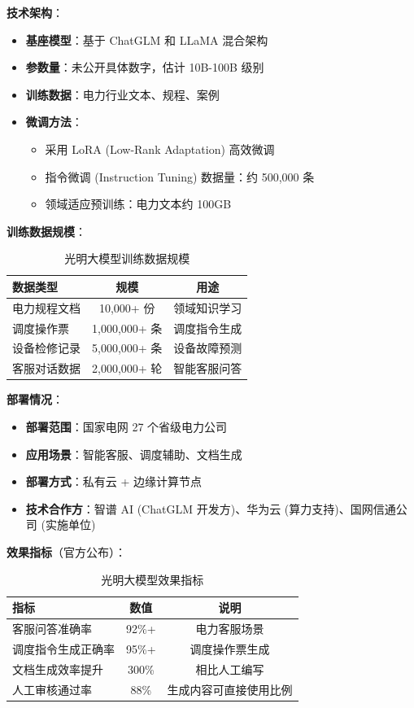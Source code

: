 \documentclass[12pt,a4paper]{article}
\begin{document}
\textbf{技术架构}：

\begin{itemize}
    \item \textbf{基座模型}：基于 ChatGLM 和 LLaMA 混合架构
    \item \textbf{参数量}：未公开具体数字，估计 10B-100B 级别
    \item \textbf{训练数据}：电力行业文本、规程、案例
    \item \textbf{微调方法}：
    \begin{itemize}
        \item 采用 LoRA (Low-Rank Adaptation) 高效微调
        \item 指令微调 (Instruction Tuning) 数据量：约 500,000 条
        \item 领域适应预训练：电力文本约 100GB
    \end{itemize}
\end{itemize}

\textbf{训练数据规模}：

\begin{table}[h]
\centering
\caption{光明大模型训练数据规模}
\label{tab:guangming-data}
\begin{tabular}{@{}lcc@{}}
\toprule
\textbf{数据类型} & \textbf{规模} & \textbf{用途} \\
\midrule
电力规程文档 & 10,000+ 份 & 领域知识学习 \\
调度操作票 & 1,000,000+ 条 & 调度指令生成 \\
设备检修记录 & 5,000,000+ 条 & 设备故障预测 \\
客服对话数据 & 2,000,000+ 轮 & 智能客服问答 \\
\bottomrule
\end{tabular}
\end{table}

\textbf{部署情况}：

\begin{itemize}
    \item \textbf{部署范围}：国家电网 27 个省级电力公司
    \item \textbf{应用场景}：智能客服、调度辅助、文档生成
    \item \textbf{部署方式}：私有云 + 边缘计算节点
    \item \textbf{技术合作方}：智谱 AI (ChatGLM 开发方)、华为云 (算力支持)、国网信通公司 (实施单位)
\end{itemize}

\textbf{效果指标}（官方公布）：

\begin{table}[h]
\centering
\caption{光明大模型效果指标}
\label{tab:guangming-metrics}
\begin{tabular}{@{}lcc@{}}
\toprule
\textbf{指标} & \textbf{数值} & \textbf{说明} \\
\midrule
客服问答准确率 & 92\%+ & 电力客服场景 \\
调度指令生成正确率 & 95\%+ & 调度操作票生成 \\
文档生成效率提升 & 300\% & 相比人工编写 \\
人工审核通过率 & 88\% & 生成内容可直接使用比例 \\
\bottomrule
\end{tabular}
\end{table}
\end{document}
